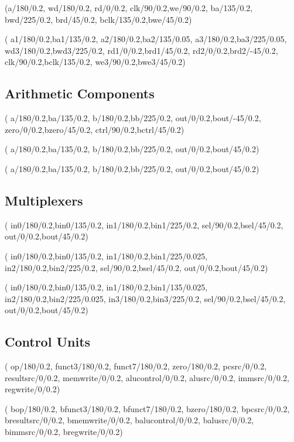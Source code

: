 \documentclass[.52pt,a4paper,titlepage]{article}
\begin{document}
(a/180/0.2, wd/180/0.2, rd/0/0.2, clk/90/0.2,we/90/0.2, ba/135/0.2, bwd/225/0.2, brd/45/0.2, bclk/135/0.2,bwe/45/0.2)

(
a1/180/0.2,ba1/135/0.2,
a2/180/0.2,ba2/135/0.05,
a3/180/0.2,ba3/225/0.05,
wd3/180/0.2,bwd3/225/0.2,
rd1/0/0.2,brd1/45/0.2,
rd2/0/0.2,brd2/-45/0.2,
clk/90/0.2,bclk/135/0.2,
we3/90/0.2,bwe3/45/0.2)

\subsection{Arithmetic Components}
(
a/180/0.2,ba/135/0.2,
b/180/0.2,bb/225/0.2,
out/0/0.2,bout/-45/0.2,
zero/0/0.2,bzero/45/0.2,
ctrl/90/0.2,bctrl/45/0.2)


(
a/180/0.2,ba/135/0.2,
b/180/0.2,bb/225/0.2,
out/0/0.2,bout/45/0.2)


(
a/180/0.2,ba/135/0.2,
b/180/0.2,bb/225/0.2,
out/0/0.2,bout/45/0.2)

\subsection{Multiplexers}
(
in0/180/0.2,bin0/135/0.2,
in1/180/0.2,bin1/225/0.2,
sel/90/0.2,bsel/45/0.2,
out/0/0.2,bout/45/0.2)

(
in0/180/0.2,bin0/135/0.2,
in1/180/0.2,bin1/225/0.025,
in2/180/0.2,bin2/225/0.2,
sel/90/0.2,bsel/45/0.2,
out/0/0.2,bout/45/0.2)

(
in0/180/0.2,bin0/135/0.2,
in1/180/0.2,bin1/135/0.025,
in2/180/0.2,bin2/225/0.025,
in3/180/0.2,bin3/225/0.2,
sel/90/0.2,bsel/45/0.2,
out/0/0.2,bout/45/0.2)

\subsection{Control Units}
(
op/180/0.2,
funct3/180/0.2,
funct7/180/0.2,
zero/180/0.2,
pcsrc/0/0.2,
resultsrc/0/0.2,
memwrite/0/0.2,
alucontrol/0/0.2,
alusrc/0/0.2,
immsrc/0/0.2,
regwrite/0/0.2)

(
bop/180/0.2,
bfunct3/180/0.2,
bfunct7/180/0.2,
bzero/180/0.2,
bpcsrc/0/0.2,
bresultsrc/0/0.2,
bmemwrite/0/0.2,
balucontrol/0/0.2,
balusrc/0/0.2,
bimmsrc/0/0.2,
bregwrite/0/0.2)
\end{document}
